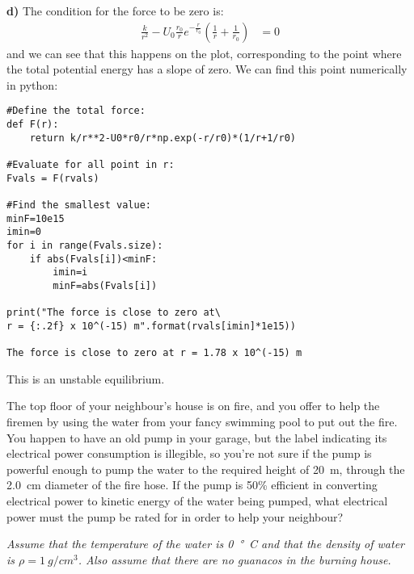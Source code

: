 \begin{solution}
\textbf{d)} The condition for the force to be zero is:
\begin{align*}
\frac{k}{r^2}-U_0\frac{r_0}{r}e^{-\frac{r}{r_0}}\left(\frac{1}{r} + \frac{1}{r_0}\right) &=0
\end{align*}
and we can see that this happens on the plot, corresponding to the point where the total potential energy has a slope of zero. We can find this point numerically in python:
\begin{verbatim}
#Define the total force:
def F(r):
    return k/r**2-U0*r0/r*np.exp(-r/r0)*(1/r+1/r0)

#Evaluate for all point in r:
Fvals = F(rvals)

#Find the smallest value:
minF=10e15
imin=0
for i in range(Fvals.size):
    if abs(Fvals[i])<minF:
        imin=i
        minF=abs(Fvals[i])
        
print("The force is close to zero at\
r = {:.2f} x 10^(-15) m".format(rvals[imin]*1e15))

The force is close to zero at r = 1.78 x 10^(-15) m
\end{verbatim}
This is an unstable equilibrium.
\end{solution}



\question The top floor of your neighbour's house is on fire, and you offer to help the firemen by using the water from your fancy swimming pool to put out the fire. You happen to have an old pump in your garage, but the label indicating its electrical power consumption is illegible, so you're not sure if the pump is powerful enough to pump the water to the required height of \SI{20}{m}, through the \SI{2.0}{cm} diameter of the fire hose. If the pump is 50\% efficient in converting electrical power to kinetic energy of the water being pumped, what electrical power must the pump be rated for in order to help your neighbour?

\textit{Assume that the temperature of the water is \SI{0}{\degree C} and that the density of water is $\rho=\SI{1}{g/cm^3}$. Also assume that there are no guanacos in the burning house.}

